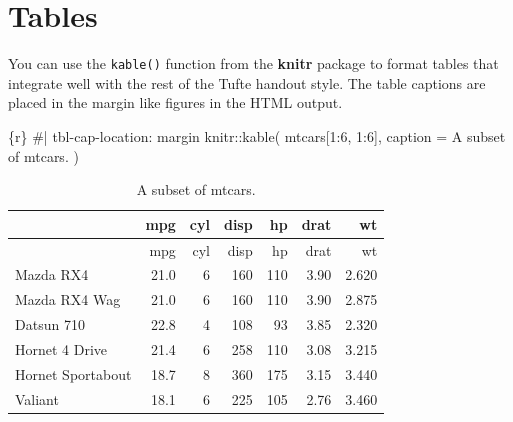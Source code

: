 \documentclass[
  letterpaper,
  DIV=11,
  numbers=noendperiod,
  oneside]{scrartcl}
\newenvironment{Shaded}{\begin{snugshade}}{\end{snugshade}}
\newcommand{\AttributeTok}[1]{\textcolor[rgb]{0.40,0.45,0.13}{#1}}
\newcommand{\CommentTok}[1]{\textcolor[rgb]{0.37,0.37,0.37}{#1}}
\newcommand{\DecValTok}[1]{\textcolor[rgb]{0.68,0.00,0.00}{#1}}
\newcommand{\FunctionTok}[1]{\textcolor[rgb]{0.28,0.35,0.67}{#1}}
\newcommand{\InformationTok}[1]{\textcolor[rgb]{0.37,0.37,0.37}{#1}}
\newcommand{\NormalTok}[1]{\textcolor[rgb]{0.00,0.23,0.31}{#1}}
\newcommand{\SpecialCharTok}[1]{\textcolor[rgb]{0.37,0.37,0.37}{#1}}
\newcommand{\StringTok}[1]{\textcolor[rgb]{0.13,0.47,0.30}{#1}}
\begin{document}
\hypertarget{tables}{%
\section{Tables}\label{tables}}

You can use the \texttt{kable()} function from the \textbf{knitr}
package to format tables that integrate well with the rest of the Tufte
handout style. The table captions are placed in the margin like figures
in the HTML output.

\begin{Shaded}
\begin{Highlighting}[]
\InformationTok{\textasciigrave{}\textasciigrave{}\textasciigrave{}\{r\}}
\CommentTok{\#| tbl{-}cap{-}location: margin}
\NormalTok{knitr}\SpecialCharTok{::}\FunctionTok{kable}\NormalTok{(}
\NormalTok{  mtcars[}\DecValTok{1}\SpecialCharTok{:}\DecValTok{6}\NormalTok{, }\DecValTok{1}\SpecialCharTok{:}\DecValTok{6}\NormalTok{], }\AttributeTok{caption =} \StringTok{\textquotesingle{}A subset of mtcars.\textquotesingle{}}
\NormalTok{)}
\InformationTok{\textasciigrave{}\textasciigrave{}\textasciigrave{}}
\end{Highlighting}
\end{Shaded}

{
\makeatletter
\def\LT@makecaption#1#2#3{%
  \noalign{\smash{\hbox{\kern\textwidth\rlap{\kern\marginparsep
  \parbox[t]{\marginparwidth}{%
    \footnotesize{%
      \vspace{(1.1\baselineskip)}
    #1{#2: }\ignorespaces #3}}}}}}%
    }
\makeatother

\begin{longtable}[]{@{}lrrrrrr@{}}
\caption{A subset of mtcars.}\tabularnewline
\toprule\noalign{}
& mpg & cyl & disp & hp & drat & wt \\
\midrule\noalign{}
\endfirsthead
\toprule\noalign{}
& mpg & cyl & disp & hp & drat & wt \\
\midrule\noalign{}
\endhead
\bottomrule\noalign{}
\endlastfoot
Mazda RX4 & 21.0 & 6 & 160 & 110 & 3.90 & 2.620 \\
Mazda RX4 Wag & 21.0 & 6 & 160 & 110 & 3.90 & 2.875 \\
Datsun 710 & 22.8 & 4 & 108 & 93 & 3.85 & 2.320 \\
Hornet 4 Drive & 21.4 & 6 & 258 & 110 & 3.08 & 3.215 \\
Hornet Sportabout & 18.7 & 8 & 360 & 175 & 3.15 & 3.440 \\
Valiant & 18.1 & 6 & 225 & 105 & 2.76 & 3.460 \\
\end{longtable}

}
\end{document}
